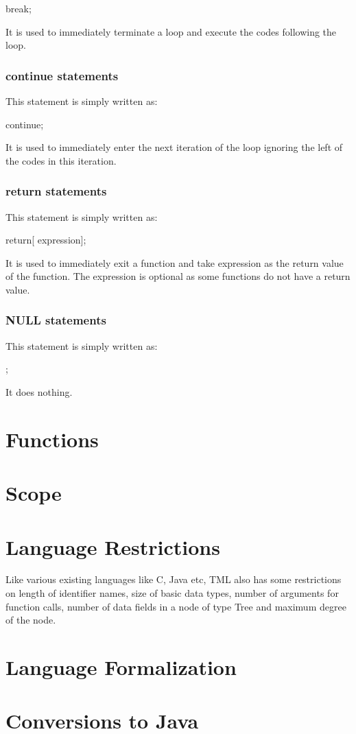 \documentclass[12pt,psfig,a4]{article}
\begin{document}
\begin{code}
break;
\end{code}

\noindent
It is used to immediately terminate a loop and execute the codes following the loop.

\subsubsection{continue statements}
This statement is simply written as:

\begin{code}
continue;
\end{code}

\noindent
It is used to immediately enter the next iteration of the loop ignoring the left of the codes in this iteration.

\subsubsection{return statements}
This statement is simply written as:

\begin{code}
return[ expression];
\end{code}

\noindent
It is used to immediately exit a function and take expression as the return value of the function. The expression is optional as some functions do not have a return value.

\subsubsection{NULL statements}
This statement is simply written as:

\begin{code}
;
\end{code}

\noindent
It does nothing.


\section{Functions}

\section{Scope}

\section{Language Restrictions}
Like various existing languages like C, Java etc, TML also has some restrictions on length of identifier names, size of basic data types, number of arguments for function calls, number of data fields in a node of type Tree and maximum degree of the node.

\section{Language Formalization}

\section{Conversions to Java}






\end{document}
